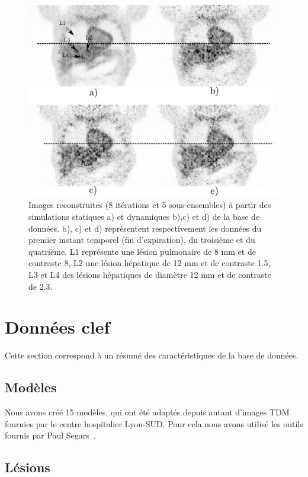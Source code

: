 \begin{figure}
 \centering
 \includegraphics[width=14cm]{images/exempleImageReconMouvement}
 \caption[Images respirantes reconstruites tirées de la base de donnée]{Images reconstruites (8 itérations et 5 sous-ensembles) à partir des simulations statiques a) et dynamiques b),c) et d) de la base de données. b), c) et d) représentent respectivement les données du premier instant temporel (fin d'expiration), du troisième et du quatrième. L1 représente une lésion pulmonaire de 8 mm et de contraste 8, L2 une lésion hépatique de 12 mm et de contraste 1.5, L3 et L4 des lésions hépatiques de diamètre 12 mm et de contraste de 2.3.}
 \label{fig:exempleImageReconMvt}
\end{figure}

\section{Données clef} %

Cette section correspond à un résumé des caractéristiques de la base de données.

\subsection{Modèles}

Nous avons créé 15 modèles, qui ont été adaptés depuis autant d'images TDM fournies par le centre hospitalier Lyon-SUD. Pour cela nous avons utilisé les outils fournis par Paul Segars~\cite{segars2001These}.


\subsection{Lésions}

